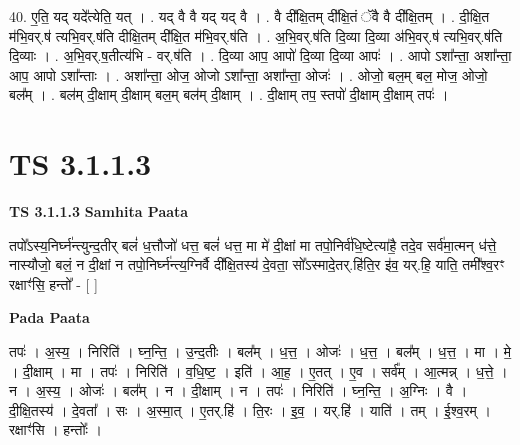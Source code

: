 \documentclass[17pt]{extarticle}
\begin{document}
40. ए॒ति॒ यद् यदे᳚त्येति॒ यत् । . यद् वै वै यद् यद् वै । . वै दी᳚क्षि॒तम् दी᳚क्षि॒तं ॅवै वै दी᳚क्षि॒तम् । . दी॒क्षि॒त म॑भि॒वर्.ष॑ त्यभि॒वर्.ष॑ति दीक्षि॒तम् दी᳚क्षि॒त म॑भि॒वर्.ष॑ति । . अ॒भि॒वर्.ष॑ति दि॒व्या दि॒व्या अ॑भि॒वर्.ष॑ त्यभि॒वर्.ष॑ति दि॒व्याः । . अ॒भि॒वर्.ष॒तीत्य॑भि - वर्.ष॑ति । . दि॒व्या आप॒ आपो॑ दि॒व्या दि॒व्या आपः॑ । . आपो ऽशा᳚न्ता॒ अशा᳚न्ता॒ आप॒ आपो ऽशा᳚न्ताः । . अशा᳚न्ता॒ ओज॒ ओजो ऽशा᳚न्ता॒ अशा᳚न्ता॒ ओजः॑ । . ओजो॒ बल॒म् बल॒ मोज॒ ओजो॒ बल᳚म् । . बल॑म् दी॒क्षाम् दी॒क्षाम् बल॒म् बल॑म् दी॒क्षाम् । . दी॒क्षाम् तप॒ स्तपो॑ दी॒क्षाम् दी॒क्षाम् तपः॑ । \newline
\pagebreak
{}

\section{ TS 3.1.1.3 }

\textbf{TS 3.1.1.3 } \newline
\textbf{Samhita Paata} \newline

तपो᳚ऽस्य॒निर्घ्न॑न्त्युन्द॒तीर् बलं॑ ध॒त्तौजो॑ धत्त॒ बलं॑ धत्त॒ मा मे॑ दी॒क्षां मा तपो॒निर्व॑धि॒ष्टेत्या॑है॒ तदे॒व सर्व॑मा॒त्मन् ध॑त्ते॒ नास्यौजो॒ बलं॒ न दी॒क्षां न तपो॒निर्घ्न॑न्त्य॒ग्निर्वै दी᳚क्षि॒तस्य॑ दे॒वता॒ सो᳚ऽस्मादे॒तर्.हि॑ति॒र इ॑व॒ यर्.हि॒ याति॒ तमी᳚श्व॒रꣳ रक्षाꣳ॑सि॒ हन्तो᳚ -  [  ] \newline

\textbf{Pada Paata} \newline

तपः॑ । अ॒स्य॒ । निरिति॑ । घ्न॒न्ति॒ । उ॒न्द॒तीः । बल᳚म् । ध॒त्त॒ । ओजः॑ । ध॒त्त॒ । बल᳚म् । ध॒त्त॒ । मा । मे॒ । दी॒क्षाम् । मा । तपः॑ । निरिति॑ । व॒धि॒ष्ट॒ । इति॑ । आ॒ह॒ । ए॒तत् । ए॒व । सर्व᳚म् । आ॒त्मन्न् । ध॒त्ते॒ । न । अ॒स्य॒ । ओजः॑ । बल᳚म् । न । दी॒क्षाम् । न । तपः॑ । निरिति॑ । घ्न॒न्ति॒ । अ॒ग्निः । वै । दी॒क्षि॒तस्य॑ । दे॒वता᳚ । सः । अ॒स्मा॒त् । ए॒तर्.हि॑ । ति॒रः । इ॒व॒ । यर्.हि॑ । याति॑ । तम् । ई॒श्व॒रम् । रक्षाꣳ॑सि । हन्तोः᳚ ।  \newline
\end{document}
